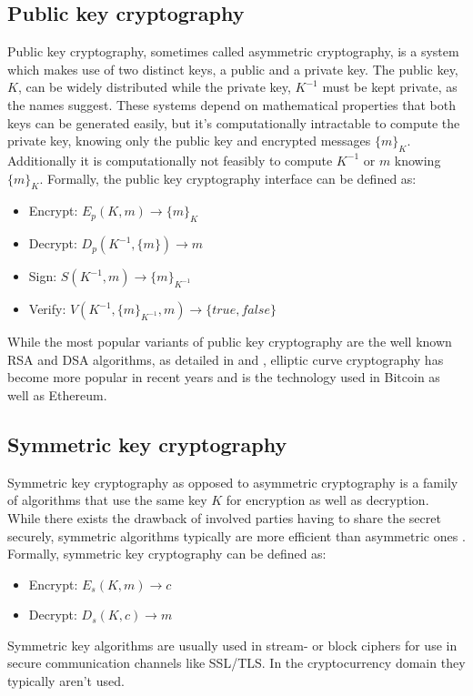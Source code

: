 \documentclass[12pt,msc,a4paper,oneside]{ucl_thesis}
\begin{document}
\subsection{Public key cryptography}
Public key cryptography, sometimes called asymmetric cryptography, is a system which makes use of two distinct keys, a public and a private key. The public key, $K$, can be widely distributed while the private key, $K^{-1}$ must be kept private, as the names suggest. These systems depend on mathematical properties that both keys can be generated easily, but it's computationally intractable to compute the private key, knowing only the public key and encrypted messages $\{m\}_K$. Additionally it is computationally not feasibly to compute $K^{-1}$ or $m$ knowing $\{m\}_K$. Formally, the public key cryptography interface can be defined as: \cite{BKarp}
\begin{itemize}
    \item{Encrypt: } $E_p(K, m) \rightarrow \{m\}_K$
    \item{Decrypt: } $D_p(K^{-1}, \{m\}) \rightarrow m$
    \item{Sign: }    $S(K^{-1}, m) \rightarrow \{m\}_{K^{-1}}$
    \item{Verify: }  $V(K^{-1}, \{m\}_{K^{-1}}, m) \rightarrow \{true, false\}$
\end{itemize}

While the most popular variants of public key cryptography are the well known RSA and DSA algorithms, as detailed in \cite{RSA:1978:MOD:359340.359342} and \cite{Kerry13fipspub}, elliptic curve cryptography has become more popular in recent years and is the technology used in Bitcoin as well as Ethereum. 

\subsection{Symmetric key cryptography}
Symmetric key cryptography as opposed to asymmetric cryptography is a family of algorithms that use the same key $K$ for encryption as well as decryption. While there exists the drawback of involved parties having to share the secret securely, symmetric algorithms typically are more efficient than asymmetric ones \cite{BKarp}. Formally, symmetric key cryptography can be defined as:
\begin{itemize}
    \item{Encrypt: } $E_s(K, m) \rightarrow c$
    \item{Decrypt: } $D_s(K, c) \rightarrow m$
\end{itemize}
Symmetric key algorithms are usually used in stream- or block ciphers for use in secure communication channels like SSL/TLS. In the cryptocurrency domain they typically aren't used.
\end{document}
